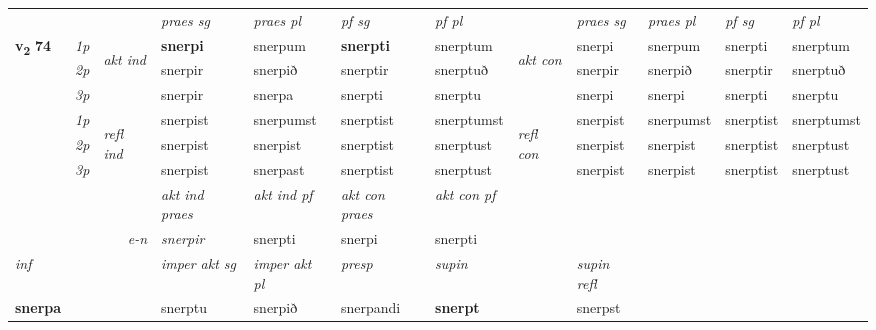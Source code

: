 \begin{longtable}[l]{X>{\footnotesize\itshape}llXXXXlXXXX}
 & &   & \textit{praes sg}  & \textit{praes pl}    & \textit{ pf sg} & \textit{pf pl} & & \textit{praes sg}  & \textit{praes pl}    & \textit{pf sg} & \textit{pf pl }  \\ \cmidrule{4-7} \cmidrule{9-12}
 \multirow{2}{*}{{{\textbf{v{\textsubscript{2}}} \Large{\textbf{74}}}}}  & 1p & \multirow{3}{*}{\begin{turn}{90}\textit{akt ind}\end{turn}} & \textbf{snerpi} & snerpum & \textbf{snerpti} & snerptum & \multirow{3}{*}{\begin{turn}{90}\textit{akt con}\end{turn}} &snerpi & snerpum & snerpti & snerptum\\*
 & 2p &  &  snerpir  & snerpið & snerptir & snerptuð & & snerpir & snerpið & snerptir & snerptuð \\*
 & 3p &  & snerpir & snerpa & snerpti & snerptu & & snerpi & snerpi& snerpti & snerptu \\*
\cmidrule{4-7} \cmidrule{9-12}
 & 1p & \multirow{3}{*}{\begin{turn}{90}\textit{refl ind}\end{turn}}  & snerpist & snerpumst & snerptist & snerptumst & \multirow{3}{*}{\begin{turn}{90}\textit{refl con}\end{turn}}  &snerpist & snerpumst & snerptist & snerptumst \\*
 & 2p &  & snerpist & snerpist & snerptist & snerptust & &snerpist & snerpist & snerptist & snerptust \\*
 & 3p  & & snerpist & snerpast & snerptist & snerptust & & snerpist & snerpist& snerptist & snerptust \\*
\cmidrule{4-7} \cmidrule{9-12}

   && &  \textit{akt ind praes} & \textit{akt ind pf} & \textit{akt con praes} & \textit{akt con pf} \\*
\multicolumn{3}{r}{\textit{e-n}} & snerpir & snerpti & snerpi & snerpti \\*

\cmidrule{4-7}
   {\textit{inf}} & &  & \textit{imper akt sg} & \textit{imper akt pl}   & \textit{presp} & \textit{supin} && \textit{supin refl}  \\*
  {\textbf{snerpa}} & && snerptu  & snerpið   & snerpandi &  \textbf{snerpt} && snerpst  \\*

\midrule


\end{longtable}
